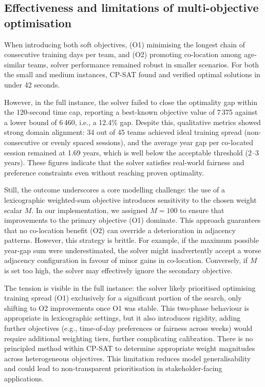 \documentclass[12pt]{article}
\begin{document}
\subsection{Effectiveness and limitations of multi-objective optimisation}

When introducing both soft objectives, (O1) minimising the longest chain of consecutive training days per team, and (O2) promoting co-location among age-similar teams, solver performance remained robust in smaller scenarios. For both the small and medium instances, CP-SAT found and verified optimal solutions in under 42 seconds.

However, in the full instance, the solver failed to close the optimality gap within the 120-second time cap, reporting a best-known objective value of 7\,375 against a lower bound of 6\,460, i.e., a 12.4\% gap. Despite this, qualitative metrics showed strong domain alignment: 34 out of 45 teams achieved ideal training spread (non-consecutive or evenly spaced sessions), and the average year gap per co-located session remained at 1.69 years, which is well below the acceptable threshold (2–3 years). These figures indicate that the solver satisfies real-world fairness and preference constraints even without reaching proven optimality.

Still, the outcome underscores a core modelling challenge: the use of a lexicographic weighted-sum objective introduces sensitivity to the chosen weight scalar \( M \). In our implementation, we assigned \( M = 100 \) to ensure that improvements to the primary objective (O1) dominate. This approach guarantees that no co-location benefit (O2) can override a deterioration in adjacency patterns. However, this strategy is brittle. For example, if the maximum possible year-gap sum were underestimated, the solver might inadvertently accept a worse adjacency configuration in favour of minor gains in co-location. Conversely, if \( M \) is set too high, the solver may effectively ignore the secondary objective.

The tension is visible in the full instance: the solver likely prioritised optimising training spread (O1) exclusively for a significant portion of the search, only shifting to O2 improvements once O1 was stable. This two-phase behaviour is appropriate in lexicographic settings, but it also introduces rigidity, adding further objectives (e.g., time-of-day preferences or fairness across weeks) would require additional weighting tiers, further complicating calibration. There is no principled method within CP-SAT to determine appropriate weight magnitudes across heterogeneous objectives. This limitation reduces model generalisability and could lead to non-transparent prioritisation in stakeholder-facing applications.
\end{document}
